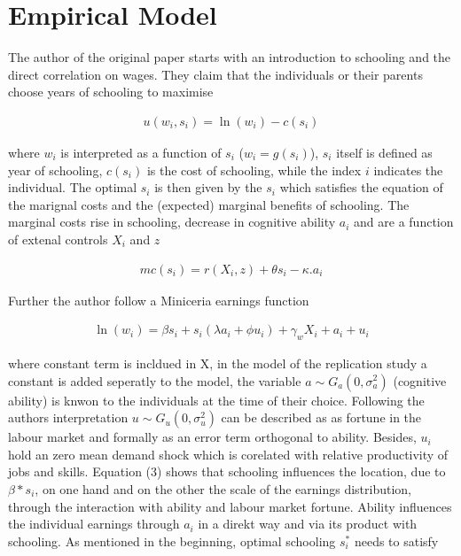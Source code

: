 \documentclass[12pt,a4paper]{article}
\begin{document}
\section{Empirical Model}\label{empirical-model}

The author of the original paper starts with an introduction to
schooling and the direct correlation on wages. They claim that the
individuals or their parents choose years of schooling to maximise

\begin{align}u\left(w_{i}, s_{i}\right)=\ln \left(w_{i}\right)-c\left(s_{i}\right)\end{align}

where \(w_i\) is interpreted as a function of \(s_i\)
(\(w_i = g(s_i)\)), \(s_i\) itself is defined as year of schooling,
\(c(s_i)\) is the cost of schooling, while the index \(i\) indicates the
individual. The optimal \(s_i\) is then given by the \(s_i\) which
satisfies the equation of the marignal costs and the (expected) marginal
benefits of schooling. The marginal costs rise in schooling, decrease in
cognitive ability \(a_i\) and are a function of extenal controls \(X_i\)
and \(z\)

\begin{align} mc\left(s_{i}\right)=r\left(X_{i}, z\right)+\theta s_{i}-\kappa .
a_{i}\end{align}

Further the author follow a Miniceria earnings function

\begin{align}\ln\left(w_{i}\right)=\beta s_{i}+s_{i}\left(\lambda a_{i}+\phi u_{i}\right)+\gamma_{w} X_{i}+a_{i}+u_{i}\end{align}

where constant term is incldued in X, in the model of the replication
study a constant is added seperatly to the model, the variable
\(a \sim G_a(0,\sigma^2_a)\) (cognitive ability) is knwon to the
individuals at the time of their choice. Following the authors
interpretation \(u \sim G_u(0,\sigma^2_u)\) can be described as as
fortune in the labour market and formally as an error term orthogonal to
ability. Besides, \(u_i\) hold an zero mean demand shock which is
corelated with relative productivity of jobs and skills. Equation (3)
shows that schooling influences the location, due to \(\beta*s_i\), on
one hand and on the other the scale of the earnings distribution,
through the interaction with ability and labour market fortune. Ability
influences the individual earnings through \(a_i\) in a direkt way and
via its product with schooling. As mentioned in the beginning, optimal
schooling \(s_i^*\) needs to satisfy
\end{document}
